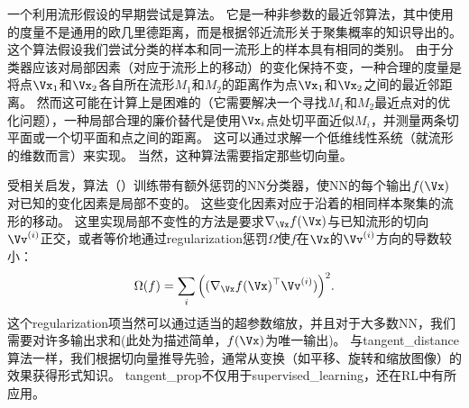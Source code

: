 一个利用流形假设的早期尝试是算法\citep{Simard-et-al-1993,Simard-et-al-1998}。
它是一种非参数的最近邻算法，其中使用的度量不是通用的欧几里德距离，而是根据邻近流形关于聚集概率的知识导出的。
这个算法假设我们尝试分类的样本和同一流形上的样本具有相同的类别。
由于分类器应该对局部因素（对应于流形上的移动）的变化保持不变，一种合理的度量是将点$\Vx_1$和$\Vx_2$各自所在流形$M_1$和$M_2$的距离作为点$\Vx_1$和$\Vx_2$之间的最近邻距离。
然而这可能在计算上是困难的（它需要解决一个寻找$M_1$和$M_2$最近点对的优化问题），一种局部合理的廉价替代是使用$\Vx_i$点处切平面近似$M_i$，并测量两条切平面或一个切平面和点之间的距离。
这可以通过求解一个低维线性系统（就流形的维数而言）来实现。
当然，这种算法需要指定那些切向量。

受相关启发，算法\citep{Simard-et-al-1992}（）训练带有额外惩罚的\gls{NN}分类器，使\gls{NN}的每个输出$f(\Vx)$对已知的变化因素是局部不变的。
这些变化因素对应于沿着的相同样本聚集的流形的移动。
这里实现局部不变性的方法是要求$\nabla_{\Vx} f(\Vx)$与已知流形的切向$\Vv^{(i)}$正交，或者等价地通过\gls{regularization}惩罚$\Omega$使$f$在$\Vx$的$\Vv^{(i)}$方向的导数较小：
\begin{align} \label{eq:767}
 \Omega(f) = \sum_i \Big((\nabla_{\Vx} f(\Vx)^\top \Vv^{(i)}) \Big)^2 .
\end{align}
这个\gls{regularization}项当然可以通过适当的超参数缩放，并且对于大多数\gls{NN}，我们需要对许多输出求和(此处为描述简单，$f(\Vx)$为唯一输出)。
与\gls{tangent_distance}算法一样，我们根据切向量推导先验，通常从变换（如平移、旋转和缩放图像）的效果获得形式知识。
\gls{tangent_prop}不仅用于\gls{supervised_learning}\citep{Simard-et-al-1992}，还在\gls{RL}\citep{Thrun-1995}中有所应用。

